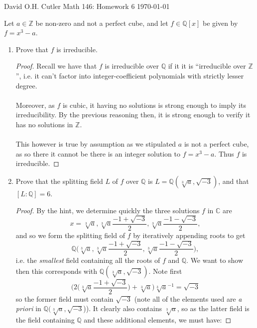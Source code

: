 \documentclass[12pt]{article}
\newenvironment{ex}[2][Exercise]{\begin{trivlist}
\item[\hskip \labelsep {\bfseries #1}\hskip \labelsep {\bfseries #2.}]}{\end{trivlist}}
\begin{document}
\noindent David O.H. Cutler \hfill {\Large Math 146: Homework 6} \hfill \today

\begin{ex}{1}
    Let $a \in \mathbb{Z}$ be non-zero and not a perfect cube, and let $f \in \mathbb{Q}[x]$ be given by $f = x^3 - a$. 
    \begin{enumerate}[label=(\alph*)]
        \item Prove that $f$ is irreducible. 
        \begin{proof}
            Recall we have that $f$ is irreducible over $\mathbb{Q}$ if it it is ``irreducible over $\mathbb{Z}$'', i.e. it can't factor into integer-coefficient polynomials with strictly lesser degree. \\ \\
            Moreover, as $f$ is cubic, it having no solutions is strong enough to imply its irreducibility. By the previous reasoning then, it is strong enough to verify it has no solutions in $\mathbb{Z}$.
            \\ \\ This however is true by assumption as we stipulated $a$ is not a perfect cube, as so there it cannot be there is an integer solution to $f = x^3 - a$. Thus $f$ is irreducible.
        \end{proof}
        \item Prove that the splitting field $L$ of $f$ over $\mathbb{Q}$ is $L = \mathbb{Q}(\sqrt[3]{a}, \sqrt{-3})$, and that $[L : \mathbb{Q}] = 6$.
        \begin{proof}
            By the hint, we determine quickly the three solutions $f$ in $\mathbb{C}$ are 
            $$x = \sqrt[3]{a}, \sqrt[3]{a}\frac{-1 + \sqrt{-3}}{2}, \sqrt[3]{a}\frac{-1 - \sqrt{-3}}{2},$$
            and so we form the splitting field of $f$ by iteratively appending roots to get
            $$\mathbb{Q}\Big (\sqrt[3]{a}, \sqrt[3]{a}\frac{-1 + \sqrt{-3}}{2}, \sqrt[3]{a}\frac{-1 - \sqrt{-3}}{2} \Big ),$$
            i.e. the \textit{smallest} field containing all the roots of $f$ and $\mathbb{Q}$. We want to show then this corresponds with $\mathbb{Q}(\sqrt[3]{a}, \sqrt{-3})$. Note first
            $$\Big (2\Big (\sqrt[3]{a}\frac{-1 + \sqrt{-3}}{2} \Big) + \sqrt[3]{a} \Big)\sqrt[3]{a}^{-1} = \sqrt{-3}$$
            so the former field must contain $\sqrt{-3}$ (note all of the elements used are \textit{a priori} in $\mathbb{Q}(\sqrt[3]{a}, \sqrt{-3}$)). It clearly also contains $\sqrt[3]{a}$, so as the latter field is the  field containing $\mathbb{Q}$ and these additional elements, we must have:

\end{proof}
\end{enumerate}
\end{ex}
\end{document}
